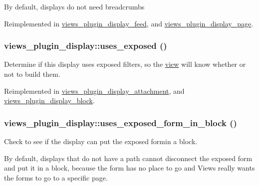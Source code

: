 By default, displays do not need breadcrumbs 

Reimplemented in \hyperlink{classviews__plugin__display__feed_a4bc729e21f5578c13d420bbaf3c388c5}{views\_\-plugin\_\-display\_\-feed}, and \hyperlink{classviews__plugin__display__page_acbdafb32168f809b28e083d654399f3f}{views\_\-plugin\_\-display\_\-page}.\hypertarget{classviews__plugin__display_a5bfcb22187618f52bea9ea626aff18a4}{
\subsubsection[{uses\_\-exposed}]{\setlength{\rightskip}{0pt plus 5cm}views\_\-plugin\_\-display::uses\_\-exposed ()}}
\label{classviews__plugin__display_a5bfcb22187618f52bea9ea626aff18a4}
Determine if this display uses exposed filters, so the \hyperlink{classview}{view} will know whether or not to build them. 

Reimplemented in \hyperlink{classviews__plugin__display__attachment_af62963a58736c80a5750c87588fb093a}{views\_\-plugin\_\-display\_\-attachment}, and \hyperlink{classviews__plugin__display__block_ab0995994a4c7436de2790c7ad8d7ea74}{views\_\-plugin\_\-display\_\-block}.\hypertarget{classviews__plugin__display_a565b6c45535dd419f600c9b27962c621}{
\subsubsection[{uses\_\-exposed\_\-form\_\-in\_\-block}]{\setlength{\rightskip}{0pt plus 5cm}views\_\-plugin\_\-display::uses\_\-exposed\_\-form\_\-in\_\-block ()}}
\label{classviews__plugin__display_a565b6c45535dd419f600c9b27962c621}
Check to see if the display can put the exposed formin a block.

By default, displays that do not have a path cannot disconnect the exposed form and put it in a block, because the form has no place to go and Views really wants the forms to go to a specific page. 

